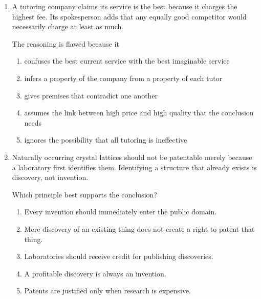 \begin{enumerate}
Which conclusion must follow?
\begin{enumerate}
\item Sensor R was not properly calibrated.
\item Every uncalibrated sensor malfunctions within two hours.
\item Humidity never damages a calibrated sensor.
\item Sensor R would have worked after three hours.
\item The ninety-minute measurement was inaccurate.
\end{enumerate}

\item A tutoring company claims its service is the best because it charges the highest fee. Its spokesperson adds that any equally good competitor would necessarily charge at least as much.

The reasoning is flawed because it
\begin{enumerate}
\item confuses the best current service with the best imaginable service
\item infers a property of the company from a property of each tutor
\item gives premises that contradict one another
\item assumes the link between high price and high quality that the conclusion needs
\item ignores the possibility that all tutoring is ineffective
\end{enumerate}

\item Naturally occurring crystal lattices should not be patentable merely because a laboratory first identifies them. Identifying a structure that already exists is discovery, not invention.

Which principle best supports the conclusion?
\begin{enumerate}
\item Every invention should immediately enter the public domain.
\item Mere discovery of an existing thing does not create a right to patent that thing.
\item Laboratories should receive credit for publishing discoveries.
\item A profitable discovery is always an invention.
\item Patents are justified only when research is expensive.
\end{enumerate}


\end{enumerate}
